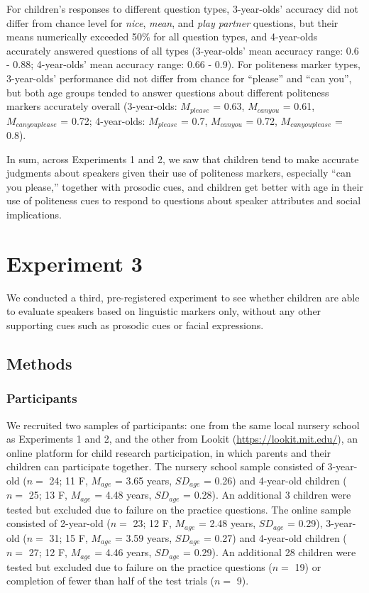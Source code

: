 \documentclass[oneside]{report}
\begin{document}
For children's responses to different question types, 3-year-olds'
accuracy did not differ from chance level for \emph{nice}, \emph{mean},
and \emph{play partner} questions, but their means numerically exceeded
50\% for all question types, and 4-year-olds accurately answered
questions of all types (3-year-olds' mean accuracy range: 0.6 - 0.88;
4-year-olds' mean accuracy range: 0.66 - 0.9). For politeness marker
types, 3-year-olds' performance did not differ from chance for
``please'' and ``can you'', but both age groups tended to answer
questions about different politeness markers accurately overall
(3-year-olds: \(M_{please}\) = 0.63, \(M_{can you}\) = 0.61,
\(M_{can you please}\) = 0.72; 4-year-olds: \(M_{please}\) = 0.7,
\(M_{can you}\) = 0.72, \(M_{can you please}\) = 0.8).

In sum, across Experiments 1 and 2, we saw that children tend to make
accurate judgments about speakers given their use of politeness markers,
especially ``can you please,'' together with prosodic cues, and children
get better with age in their use of politeness cues to respond to
questions about speaker attributes and social implications.

\section{Experiment 3}\label{experiment-3}

We conducted a third, pre-registered experiment to see whether children
are able to evaluate speakers based on linguistic markers only, without
any other supporting cues such as prosodic cues or facial expressions.

\subsection{Methods}\label{methods-2}

\subsubsection{Participants}\label{participants-2}

We recruited two samples of participants: one from the same local
nursery school as Experiments 1 and 2, and the other from Lookit
(\url{https://lookit.mit.edu/}), an online platform for child research
participation, in which parents and their children can participate
together. The nursery school sample consisted of 3-year-old (\(n=\) 24;
11 F, \(M_{age}\) = 3.65 years, \(SD_{age}\) = 0.26) and 4-year-old
children (\(n=\) 25; 13 F, \(M_{age}\) = 4.48 years, \(SD_{age}\) =
0.28). An additional 3 children were tested but excluded due to failure
on the practice questions. The online sample consisted of 2-year-old
(\(n=\) 23; 12 F, \(M_{age}\) = 2.48 years, \(SD_{age}\) = 0.29),
3-year-old (\(n=\) 31; 15 F, \(M_{age}\) = 3.59 years, \(SD_{age}\) =
0.27) and 4-year-old children (\(n=\) 27; 12 F, \(M_{age}\) = 4.46
years, \(SD_{age}\) = 0.29). An additional 28 children were tested but
excluded due to failure on the practice questions (\(n=\) 19) or
completion of fewer than half of the test trials (\(n=\) 9).
\end{document}
